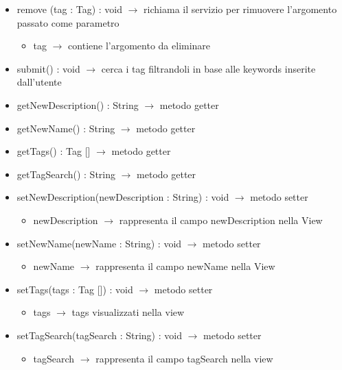 \begin{description}
\begin{itemize}
	\item remove (tag : Tag) : void $\rightarrow$ richiama il servizio per rimuovere l'argomento passato come parametro\begin{itemize}
		\item tag $\rightarrow$ contiene l'argomento da eliminare 
	\end{itemize}
	
	\item submit() : void $\rightarrow$ cerca i tag filtrandoli in base alle keywords inserite dall'utente
	\item getNewDescription() : String $\rightarrow$ metodo getter
	\item getNewName() : String $\rightarrow$ metodo getter
	\item getTags() : Tag [] $\rightarrow$ metodo getter
	\item getTagSearch() : String $\rightarrow$ metodo getter
	\item setNewDescription(newDescription : String) : void $\rightarrow$ metodo setter\begin{itemize}
		\item newDescription $\rightarrow$ rappresenta il campo newDescription nella View
	\end{itemize}
	
	\item setNewName(newName : String) : void $\rightarrow$ metodo setter\begin{itemize}
		\item newName $\rightarrow$ rappresenta il campo newName nella View
	\end{itemize}
	
	\item setTags(tags : Tag []) : void $\rightarrow$ metodo setter\begin{itemize}
		\item tags $\rightarrow$ tags visualizzati nella view
	\end{itemize}
	
	\item setTagSearch(tagSearch : String) : void $\rightarrow$ metodo setter\begin{itemize}
		\item tagSearch $\rightarrow$ rappresenta il campo tagSearch nella view
	\end{itemize}
	
\end{itemize}

\end{description}

